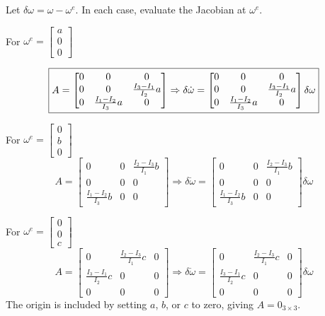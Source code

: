 \documentclass[12pt,a4paper]{article}
\begin{document}
Let $\delta\omega=\omega-\omega^e$. In each case, evaluate the Jacobian at $\omega^e$.

For $\omega^e = \begin{bmatrix}
	a \\ 0 \\ 0
\end{bmatrix}$

\[
\boxed{A = \begin{bmatrix}
		0 & 0 & 0 \\
		0 & 0 & {I_3 - I_1 \over I_2} a \\
		0 & {I_1 - I_2 \over I_3} a & 0 \\
\end{bmatrix} \Rightarrow \delta \dot \omega = \begin{bmatrix}
0 & 0 & 0 \\
0 & 0 & {I_3 - I_1 \over I_2} a \\
0 & {I_1 - I_2 \over I_3} a & 0 \\
\end{bmatrix} \delta\omega
} 
\]

For $\omega^e = \begin{bmatrix}0\\b\\0\end{bmatrix}$
\[
\boxed{
A=\begin{bmatrix}
0 & 0 & \frac{I_2-I_3}{I_1}b\\
0 & 0 & 0\\
\frac{I_1-I_2}{I_3}b & 0 & 0
\end{bmatrix}
\Rightarrow
\delta\dot\omega=\begin{bmatrix}
0 & 0 & \frac{I_2-I_3}{I_1}b\\
0 & 0 & 0\\
\frac{I_1-I_2}{I_3}b & 0 & 0
\end{bmatrix}\delta\omega
}
\]

For $\omega^e = \begin{bmatrix}0\\0\\c\end{bmatrix}$
\[
\boxed{
A=\begin{bmatrix}
0 & \frac{I_2-I_3}{I_1}c & 0\\
\frac{I_3-I_1}{I_2}c & 0 & 0\\
0 & 0 & 0
\end{bmatrix}
\Rightarrow
\delta\dot\omega=\begin{bmatrix}
0 & \frac{I_2-I_3}{I_1}c & 0\\
\frac{I_3-I_1}{I_2}c & 0 & 0\\
0 & 0 & 0
\end{bmatrix}\delta\omega
}
\]
The origin is included by setting $a$, $b$, or $c$ to zero, giving $\boxed{A=0_{3\times3}}$.
\end{document}
